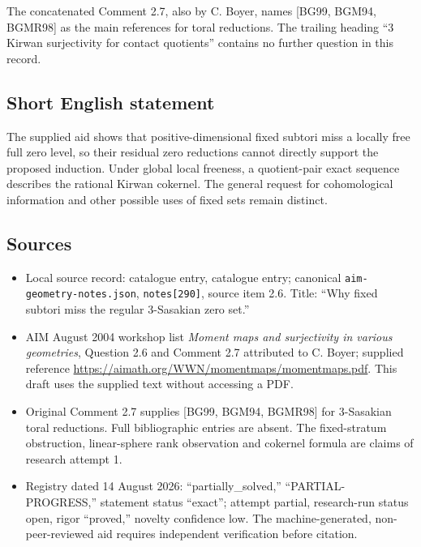 \documentclass[11pt]{article}
\begin{document}
The concatenated Comment 2.7, also by C. Boyer, names [BG99, BGM94, BGMR98] as the main references for toral reductions. The trailing heading ``3 Kirwan surjectivity for contact quotients'' contains no further question in this record.
\subsection{Short English statement}
The supplied aid shows that positive-dimensional fixed subtori miss a locally free full zero level, so their residual zero reductions cannot directly support the proposed induction. Under global local freeness, a quotient-pair exact sequence describes the rational Kirwan cokernel. The general request for cohomological information and other possible uses of fixed sets remain distinct.
\subsection{Sources}
\begin{itemize}
\item Local source record: catalogue entry, catalogue entry; canonical \texttt{aim-geometry-notes.json}, \texttt{notes[290]}, source item 2.6. Title: ``Why fixed subtori miss the regular 3-Sasakian zero set.''
\item AIM August 2004 workshop list \emph{Moment maps and surjectivity in various geometries}, Question 2.6 and Comment 2.7 attributed to C. Boyer; supplied reference \url{https://aimath.org/WWN/momentmaps/momentmaps.pdf}. This draft uses the supplied text without accessing a PDF.
\item Original Comment 2.7 supplies [BG99, BGM94, BGMR98] for 3-Sasakian toral reductions. Full bibliographic entries are absent. The fixed-stratum obstruction, linear-sphere rank observation and cokernel formula are claims of research attempt 1.
\item Registry dated 14 August 2026: ``partially\_solved,'' ``PARTIAL-PROGRESS,'' statement status ``exact''; attempt partial, research-run status open, rigor ``proved,'' novelty confidence low. The machine-generated, non-peer-reviewed aid requires independent verification before citation.
\end{itemize}
\end{document}
